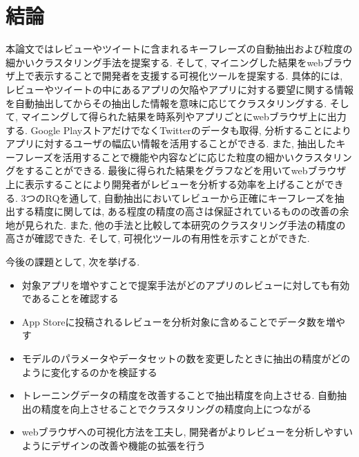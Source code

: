\chapter{結論}
\label{chap:keturon}

本論文ではレビューやツイートに含まれるキーフレーズの自動抽出および粒度の細かいクラスタリング手法を提案する. そして, マイニングした結果をwebブラウザ上で表示することで開発者を支援する可視化ツールを提案する. 
具体的には, レビューやツイートの中にあるアプリの欠陥やアプリに対する要望に関する情報を自動抽出してからその抽出した情報を意味に応じてクラスタリングする.  そして, マイニングして得られた結果を時系列やアプリごとにwebブラウザ上に出力する.
Google PlayストアだけでなくTwitterのデータも取得, 分析することによりアプリに対するユーザの幅広い情報を活用することができる. また, 抽出したキーフレーズを活用することで機能や内容などに応じた粒度の細かいクラスタリングをすることができる. 最後に得られた結果をグラフなどを用いてwebブラウザ上に表示することにより開発者がレビューを分析する効率を上げることができる. 
3つのRQを通して, 自動抽出においてレビューから正確にキーフレーズを抽出する精度に関しては, ある程度の精度の高さは保証されているものの改善の余地が見られた. また, 他の手法と比較して本研究のクラスタリング手法の精度の高さが確認できた. そして, 可視化ツールの有用性を示すことができた. 

今後の課題として, 次を挙げる. 

\begin{itemize}
    \item 対象アプリを増やすことで提案手法がどのアプリのレビューに対しても有効であることを確認する
    \item App Storeに投稿されるレビューを分析対象に含めることでデータ数を増やす
    \item モデルのパラメータやデータセットの数を変更したときに抽出の精度がどのように変化するのかを検証する
    \item トレーニングデータの精度を改善することで抽出精度を向上させる. 自動抽出の精度を向上させることでクラスタリングの精度向上につながる
    \item webブラウザへの可視化方法を工夫し, 開発者がよりレビューを分析しやすいようにデザインの改善や機能の拡張を行う
\end{itemize}
